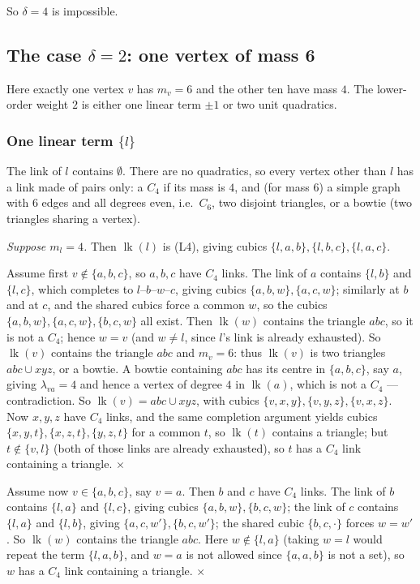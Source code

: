 \documentclass[11pt,reqno]{amsart}
\theoremstyle{plain}
\theoremstyle{definition}
\numberwithin{theorem}{section}
\newcommand{\lk}{\operatorname{lk}}
\begin{document}
So $\delta = 4$ is impossible.

\subsection{The case \texorpdfstring{$\delta = 2$}{delta = 2}: one vertex of mass 6}
\label{app:delta2}

Here exactly one vertex $v$ has $m_v = 6$ and the other ten have mass $4$. The lower-order
weight $2$ is either one linear term $\pm1$ or two unit quadratics.

\subsubsection*{One linear term $\{l\}$}
The link of $l$ contains $\emptyset$. There are no quadratics, so every vertex other than $l$
has a link made of pairs only: a $C_4$ if its mass is $4$, and (for mass $6$) a simple graph
with $6$ edges and all degrees even, i.e.\ $C_6$, two disjoint triangles, or a bowtie (two
triangles sharing a vertex).

\emph{Suppose $m_l = 4$.} Then $\lk(l)$ is (L4), giving cubics
$\{l,a,b\}, \{l,b,c\}, \{l,a,c\}$.

Assume first $v \notin \{a,b,c\}$, so $a,b,c$ have $C_4$ links. The link of $a$ contains
$\{l,b\}$ and $\{l,c\}$, which completes to $l$--$b$--$w$--$c$, giving cubics
$\{a,b,w\}, \{a,c,w\}$; similarly at $b$ and at $c$, and the shared cubics force a common $w$,
so the cubics $\{a,b,w\}, \{a,c,w\}, \{b,c,w\}$ all exist. Then $\lk(w)$ contains the triangle
$abc$, so it is not a $C_4$; hence $w = v$ (and $w \ne l$, since $l$'s link is already
exhausted). So $\lk(v)$ contains the triangle $abc$ and $m_v = 6$: thus $\lk(v)$ is two
triangles $abc \cup xyz$, or a bowtie. A bowtie containing $abc$ has its centre in
$\{a,b,c\}$, say $a$, giving $\lambda_{va} = 4$ and hence a vertex of degree $4$ in $\lk(a)$,
which is not a $C_4$ --- contradiction. So $\lk(v) = abc \cup xyz$, with cubics
$\{v,x,y\}, \{v,y,z\}, \{v,x,z\}$. Now $x, y, z$ have $C_4$ links, and the same completion
argument yields cubics $\{x,y,t\}, \{x,z,t\}, \{y,z,t\}$ for a common $t$, so $\lk(t)$ contains
a triangle; but $t \notin \{v, l\}$ (both of those links are already exhausted), so $t$ has a
$C_4$ link containing a triangle. \hfill$\times$

Assume now $v \in \{a,b,c\}$, say $v = a$. Then $b$ and $c$ have $C_4$ links. The link of $b$
contains $\{l,a\}$ and $\{l,c\}$, giving cubics $\{a,b,w\}, \{b,c,w\}$; the link of $c$ contains
$\{l,a\}$ and $\{l,b\}$, giving $\{a,c,w'\}, \{b,c,w'\}$; the shared cubic $\{b,c,\cdot\}$ forces
$w = w'$. So $\lk(w)$ contains the triangle $abc$. Here $w \notin \{l, a\}$ (taking $w = l$ would
repeat the term $\{l,a,b\}$, and $w = a$ is not allowed since $\{a,a,b\}$ is not a set), so $w$
has a $C_4$ link containing a triangle. \hfill$\times$
\end{document}

